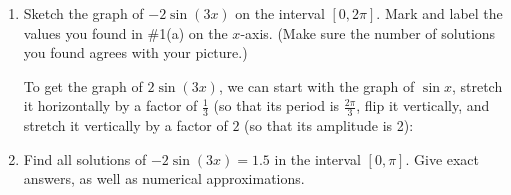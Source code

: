\documentclass{article}
\begin{document}
\begin{enumerate}
\begin{enumerate}
  \item
\begin{problem}[\stretch{2}]
      Sketch the graph of $-2 \sin (3x)$ on the interval $[0, 2 \pi]$.
      Mark and label the values you found in
      {{{{\#1}}(a)}} on the $x$-axis.  (Make sure the
      number of solutions you found agrees with your picture.)
    \end{problem}

    \begin{solution}
      To get the graph of $2 \sin(3x)$, we can start with the graph of
      $\sin x$, stretch it horizontally by a factor of $\frac{1}{3}$ (so
      that its period is $\frac{2 \pi}{3}$, flip it vertically, and
      stretch it vertically by a factor of $2$ (so that its amplitude is
      2):
      \begin{center}
      \end{center}
    \end{solution}

  \item
    \begin{problem}[\stretch{2}]
      Find all solutions of $-2 \sin (3x) = 1.5$ in the interval $[0,\pi]$.
      Give exact answers, as well as
      numerical approximations.
    \end{problem}    



\end{enumerate}
\end{enumerate}
\end{document}
